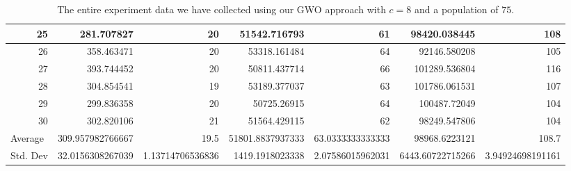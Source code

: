 \begin{table}
\begin{adjustwidth}{}{}
{{\begin{tabular}{|r|r|r|r|r|r|r|}
					\hline
					25                                         & 281.707827                   & 20                                    & 51542.716793                   & 61                                    & 98420.038445                 & 108                                    \\ 
					\hline
					26                                         & 358.463471                   & 20                                    & 53318.161484                   & 64                                    & 92146.580208                 & 105                                    \\ 
					\hline
					27                                         & 393.744452                   & 20                                    & 50811.437714                   & 66                                    & 101289.536804                & 116                                    \\ 
					\hline
					28                                         & 304.854541                   & 19                                    & 53189.377037                   & 63                                    & 101786.061531                & 107                                    \\ 
					\hline
					29                                         & 299.836358                   & 20                                    & 50725.26915                    & 64                                    & 100487.72049                 & 104                                    \\ 
					\hline
					30                                         & 302.820106                   & 21                                    & 51564.429115                   & 62                                    & 98249.547806                 & 104                                    \\ 
					\hline
					\multicolumn{1}{|l|}{Average}              & 309.957982766667             & 19.5                                  & 51801.8837937333               & 63.0333333333333                      & 98968.6223121                & 108.7                                  \\ 
					\hline
					\multicolumn{1}{|l|}{Std. Dev}             & 32.0156308267039             & 1.13714706536836                      & 1419.1918023338                & 2.07586015962031                      & 6443.60722715266             & 3.94924698191161                       \\
					\hline
		\end{tabular}}}
	\end{adjustwidth}
	\caption{The entire experiment data we have collected using our GWO approach with $c = 8$ and a population of $75$.}
	\label{full-data-gwo-c8-p75}
\end{table}

